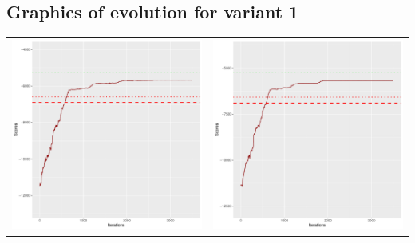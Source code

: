 \documentclass[]{scrartcl}
\begin{document}
\newpage

\subsection{Graphics of evolution for variant 1}

\begin{table}[h!]
\begin{tabular}{cc}
\includegraphics[scale = 0.4]{./figs/alarm/v1/30/boundsEvolution-3502.pdf} & 
\includegraphics[scale = 0.4]{./figs/alarm/v1/50/boundsEvolution-3502.pdf} \\

\end{tabular}
\end{table}
\end{document}
